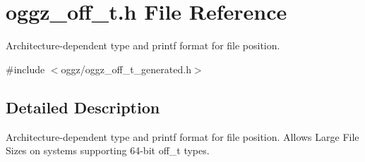 \section{oggz\-\_\-off\-\_\-t.\-h \-File \-Reference}
\label{oggz__off__t_8h}


\-Architecture-\/dependent type and printf format for file position.  


{\ttfamily \#include $<$oggz/oggz\-\_\-off\-\_\-t\-\_\-generated.\-h$>$}\*


\subsection{\-Detailed \-Description}
\-Architecture-\/dependent type and printf format for file position. \-Allows \-Large \-File \-Sizes on systems supporting 64-\/bit off\-\_\-t types. 